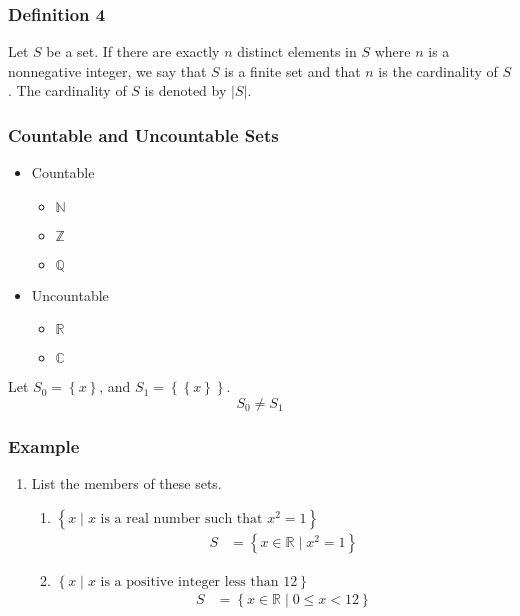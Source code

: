 \documentclass{article}
\begin{document}
\subsubsection{Definition 4}

Let $ S $ be a set. If there are exactly $ n $ distinct elements in $ S $ where $ n $ is a nonnegative integer, we say that $ S $ is a finite set and that $ n $ is the cardinality of $ S $. The cardinality of $ S $ is denoted by $ |S| $.

\subsubsection{Countable and Uncountable Sets}

\begin{itemize}
	\item Countable
		\begin{itemize}
			\item $ \mathbb{N} $
			\item $ \mathbb{Z} $
			\item $ \mathbb{Q} $
		\end{itemize}
	\item Uncountable
		\begin{itemize}
			\item $ \mathbb{R} $
			\item $ \mathbb{C} $
		\end{itemize}
\end{itemize}

Let $ S_0 = \left\{ x \right\} $, and $ S_1 = \left\{ \left\{ x \right\} \right\} $.
\begin{equation}
	S_0 \neq S_1
\end{equation}

\subsubsection{Example}

\begin{enumerate}
\item List the members of these sets.
	\begin{enumerate}[label = \textbf{\alph*)}]
		\item $ \left\{ x \mid x \text{ is a real number such that } x^2 = 1 \right\} $
			\begin{align*}
				S & = \left\{ x \in \mathbb{R} \mid x^2 = 1 \right\}
			\end{align*}
		\item $ \left\{ x \mid x \text{ is a positive integer less than 12} \right\} $
			\begin{align*}
				S & = \left\{ x \in \mathbb{R} \mid 0 \leq x < 12 \right\}
			\end{align*}
	\end{enumerate}
\end{enumerate}
\end{document}
